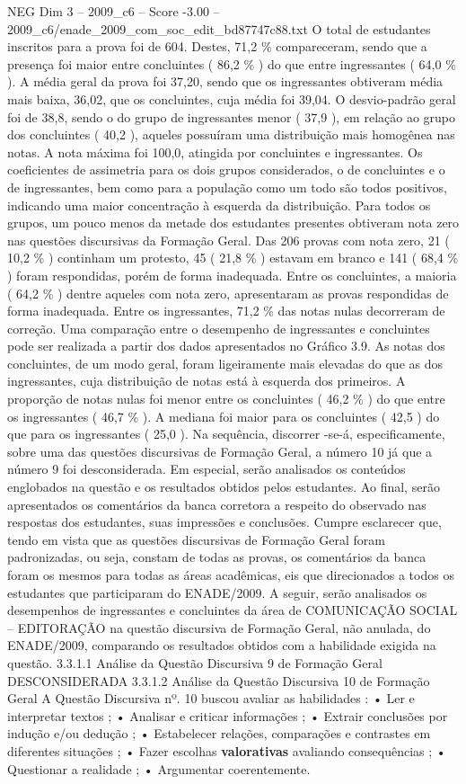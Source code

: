 \begin{textsample}{NEG Dim 3 – 2009\_c6 – Score -3.00 – 2009\_c6/enade\_2009\_com\_soc\_edit\_bd87747c88.txt}
O total de estudantes inscritos para a prova foi de 604.
Destes, 71,2 \% compareceram, sendo que a presença foi maior entre concluintes ( 86,2 \% ) do que entre ingressantes ( 64,0 \% ).
A média geral da prova foi 37,20, sendo que os ingressantes obtiveram média mais baixa, 36,02, que os concluintes, cuja média foi 39,04.
O desvio-padrão geral foi de 38,8, sendo o do grupo de ingressantes menor ( 37,9 ), em relação ao grupo dos concluintes ( 40,2 ), aqueles possuíram uma distribuição mais homogênea nas notas.
A nota máxima foi 100,0, atingida por concluintes e ingressantes.
Os coeficientes de assimetria para os dois grupos considerados, o de concluintes e o de ingressantes, bem como para a população como um todo são todos positivos, indicando uma maior concentração à esquerda da distribuição.
Para todos os grupos, um pouco menos da metade dos estudantes presentes obtiveram nota zero nas questões discursivas da Formação Geral.
Das 206 provas com nota zero, 21 ( 10,2 \% ) continham um protesto, 45 ( 21,8 \% ) estavam em branco e 141 ( 68,4 \% ) foram respondidas, porém de forma inadequada.
Entre os concluintes, a maioria ( 64,2 \% ) dentre aqueles com nota zero, apresentaram as provas respondidas de forma inadequada.
Entre os ingressantes, 71,2 \% das notas nulas decorreram de correção.
Uma comparação entre o desempenho de ingressantes e concluintes pode ser realizada a partir dos dados apresentados no Gráfico 3.9.
As notas dos concluintes, de um modo geral, foram ligeiramente mais elevadas do que as dos ingressantes, cuja distribuição de notas está à esquerda dos primeiros.
A proporção de notas nulas foi menor entre os concluintes ( 46,2 \% ) do que entre os ingressantes ( 46,7 \% ).
A mediana foi maior para os concluintes ( 42,5 ) do que para os ingressantes ( 25,0 ).
Na sequência, discorrer -se-á, especificamente, sobre uma das questões discursivas de Formação Geral, a número 10 já que a número 9 foi desconsiderada.
Em especial, serão analisados os conteúdos englobados na questão e os resultados obtidos pelos estudantes.
Ao final, serão apresentados os comentários da banca corretora a respeito do observado nas respostas dos estudantes, suas impressões e conclusões.
Cumpre esclarecer que, tendo em vista que as questões discursivas de Formação Geral foram padronizadas, ou seja, constam de todas as provas, os comentários da banca foram os mesmos para todas as áreas acadêmicas, eis que direcionados a todos os estudantes que participaram do ENADE/2009.
A seguir, serão analisados os desempenhos de ingressantes e concluintes da área de COMUNICAÇÃO SOCIAL – EDITORAÇÃO na questão discursiva de Formação Geral, não anulada, do ENADE/2009, comparando os resultados obtidos com a habilidade exigida na questão. 3.3.1.1 Análise da Questão Discursiva 9 de Formação Geral DESCONSIDERADA 3.3.1.2 Análise da Questão Discursiva 10 de Formação Geral A Questão Discursiva nº. 10 buscou avaliar as habilidades : • Ler e interpretar textos ; • Analisar e criticar informações ; • Extrair conclusões por indução e/ou dedução ; • Estabelecer relações, comparações e contrastes em diferentes situações ; • Fazer escolhas \textbf{valorativas} avaliando consequências ; • Questionar a realidade ; • Argumentar coerentemente.

\end{textsample}
